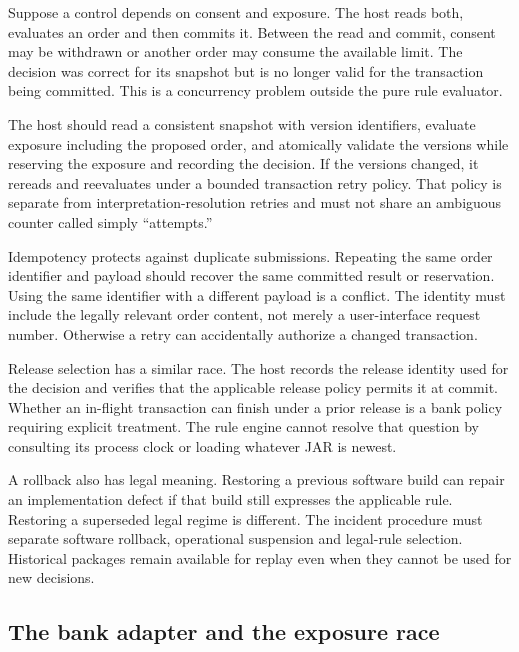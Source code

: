 Suppose a control depends on consent and exposure. The host reads both, evaluates
an order and then commits it. Between the read and commit, consent may be
withdrawn or another order may consume the available limit. The decision was
correct for its snapshot but is no longer valid for the transaction being
committed. This is a concurrency problem outside the pure rule evaluator.

The host should read a consistent snapshot with version identifiers, evaluate
exposure including the proposed order, and atomically validate the versions while
reserving the exposure and recording the decision. If the versions changed, it
rereads and reevaluates under a bounded transaction retry policy. That policy is
separate from interpretation-resolution retries and must not share an ambiguous
counter called simply ``attempts.''


Idempotency protects against duplicate submissions. Repeating the same order
identifier and payload should recover the same committed result or reservation.
Using the same identifier with a different payload is a conflict. The identity
must include the legally relevant order content, not merely a user-interface
request number. Otherwise a retry can accidentally authorize a changed transaction.

Release selection has a similar race. The host records the release identity used
for the decision and verifies that the applicable release policy permits it at
commit. Whether an in-flight transaction can finish under a prior release is a
bank policy requiring explicit treatment. The rule engine cannot resolve that
question by consulting its process clock or loading whatever JAR is newest.

A rollback also has legal meaning. Restoring a previous software build can repair
an implementation defect if that build still expresses the applicable rule.
Restoring a superseded legal regime is different. The incident procedure must
separate software rollback, operational suspension and legal-rule selection.
Historical packages remain available for replay even when they cannot be used for
new decisions.

\subsection{The bank adapter and the exposure race}
\label{merge:P-03d-java-delivery:05}


